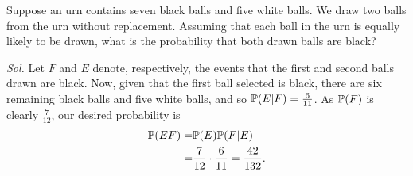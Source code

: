 \begin{example}
    Suppose an urn contains seven black balls and five white balls. We
    draw two balls from the urn without replacement. Assuming that each ball in the urn is equally likely to be drawn, what is the probability that both drawn balls are black?

    \textit{ Sol. } Let $F$ and $E$ denote, respectively, the events that the first and second balls drawn are black. Now, given that the first ball selected is black, there are six remaining black balls and five white balls, and so $\mathbb{P} (E|F) = \frac{6}{11}$. As $\mathbb{P} (F)$ is
    clearly $\frac{7}{12}$, our desired probability is 
    \begin{align*}
        \mathbb{P} (EF) = & \mathbb{P} (E) \mathbb{P} (F | E) \\ 
        = & \frac{7}{12} \cdot \frac{6}{11} = \frac{42}{132}.
    \end{align*}
\end{example}

